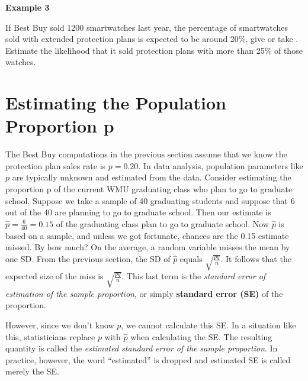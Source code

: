 \documentclass[11pt]{book}\usepackage[]{graphicx}\usepackage[]{color}
\begin{document}
\begin{minipage}[ht]{3cm}

\vspace{-14mm}

\textbf{Example 3}
\end{minipage}
\begin{minipage}[ht]{11cm}

\parbox{11cm}{
If Best Buy sold 1200 smartwatches last year, the percentage of smartwatches sold with extended protection plans is expected to be around 20\%, give or take \underline{\phantom{xxxxxx}}.  Estimate the likelihood that it sold protection plans with more than 25\% of those watches.
}
\end{minipage}

\section{Estimating the Population Proportion p}

The Best Buy computations in the previous section assume that we know the protection plan sales rate is $p = 0.20$.  In data analysis, population parameters like $p$ are typically unknown and estimated from the data.  Consider estimating the proportion p of the current WMU graduating class who plan to go to graduate school.  Suppose we take a sample of 40 graduating students and suppose that 6 out of the 40 are planning to go to graduate school.  Then our estimate is $\hat{p} = \frac{6}{40} = 0.15$ of the graduating class plan to go to graduate school.  Now $\hat{p}$ is based on a sample, and unless we got fortunate, chances are the 0.15 estimate missed.  By how much?  On the average, a random variable misses the mean by one SD.  From the previous section, the SD of $\hat{p}$  equals $\sqrt{ \frac{pq}{n}}$.   It follows that the expected size of the miss is $\sqrt{ \frac{pq}{n}}$.   This last term is the \textit{standard error of estimation of the sample proportion}, or simply \textbf{standard error (SE)} of the proportion.

However, since we don't know $p$, we cannot calculate this SE.  In a situation like this, statisticians replace $p$ with $\hat{p}$  when calculating the SE.  The resulting quantity is called the \textit{estimated standard error of the sample proportion}.  In practice, however, the word ``estimated'' is dropped and estimated SE is called merely the SE.

\end{document}

